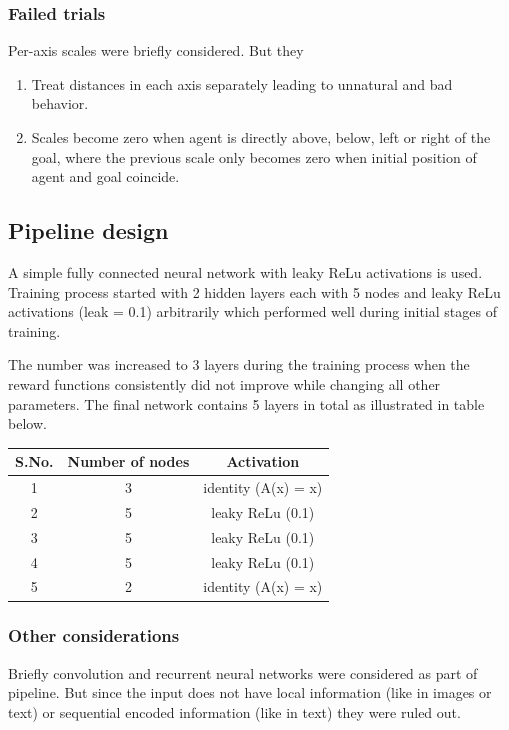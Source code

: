 \documentclass[12pt]{article}
\begin{document}
\subsubsection{Failed trials}
Per-axis scales were briefly considered. But they
\begin{enumerate}[nolistsep]
    \item Treat distances in each axis separately leading to unnatural and bad behavior.
    \item Scales become zero when agent is directly above, below, left or right of the goal, where the previous scale only becomes zero when initial position of agent and goal coincide.
\end{enumerate}

\subsection{Pipeline design}
A simple fully connected neural network with leaky ReLu activations is used.
Training process started with 2 hidden layers each with 5 nodes and leaky ReLu activations (leak = 0.1) arbitrarily which performed well during initial stages of training.

The number was increased to 3 layers during the training process when the reward functions consistently did not improve while changing all other parameters.
The final network contains 5 layers in total as illustrated in table below.
\begin{center}
\begin{tabular}{ |c|c|c| }
 \hline
 S.No. & Number of nodes & Activation \\
 \hline
 1 & 3 & identity (A(x) = x) \\
 \hline
 2 & 5 & leaky ReLu (0.1) \\
 3 & 5 & leaky ReLu (0.1) \\
 4 & 5 & leaky ReLu (0.1) \\
 \hline
 5 & 2 & identity (A(x) = x) \\
 \hline
\end{tabular}
\end{center}

\subsubsection{Other considerations}
Briefly convolution and recurrent neural networks were considered as part of pipeline.
But since the input does not have local information (like in images or text) or sequential encoded information (like in text) they were ruled out.
\end{document}
